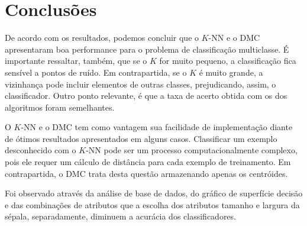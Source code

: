 \documentclass{article}
\begin{document}

\section{Conclusões}

De acordo com os resultados, podemos concluir que o $K$-NN e o DMC apresentaram boa performance para o problema de classificação multiclasse. É importante ressaltar, também, que se o $K$ for muito pequeno, a classificação fica sensível a pontos de ruído. Em contrapartida, se o $K$ é muito grande, a vizinhança pode incluir elementos de outras classes, prejudicando, assim, o classificador. Outro ponto relevante, é que a taxa de acerto obtida com os dos algoritmos foram semelhantes.

O $K$-NN e o DMC tem como vantagem sua facilidade de implementação diante de ótimos resultados apresentados em alguns casos. Classificar um exemplo desconhecido com o $K$-NN pode ser um processo computacionalmente complexo, pois ele requer um cálculo de distância para cada exemplo de treinamento. Em contrapartida, o DMC trata desta questão armazenando apenas os centróides.

Foi observado através da análise de base de dados, do gráfico de superfície decisão e das combinações de atributos que a escolha dos atributos tamanho e largura da sépala, separadamente, diminuem a acurácia dos classificadores.

%
\end{document}
